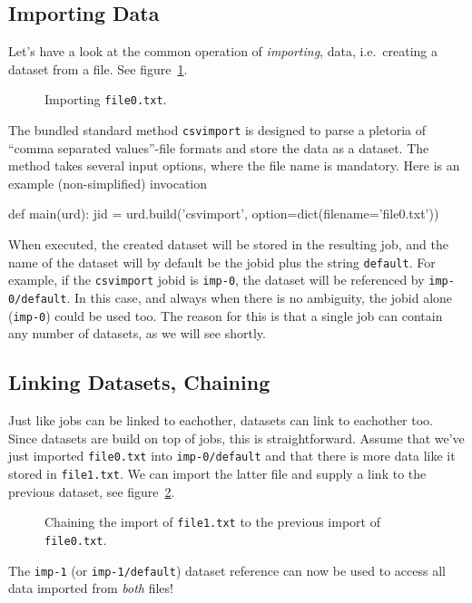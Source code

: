 \subsection{Importing Data}

Let's have a look at the common operation of \textsl{importing},
data, i.e.\ creating a dataset from a file.  See
figure~\ref{fig:dataset_csvimport}.

\begin{figure}[h!]
  \begin{center}
    
    \caption{Importing \texttt{file0.txt}.}
    \label{fig:dataset_csvimport}
  \end{center}
\end{figure}

\noindent The bundled standard method \texttt{csvimport} is designed
to parse a pletoria of ``comma separated values''-file formats and
store the data as a dataset.  The method takes several input options,
where the file name is mandatory.  Here is an example (non-simplified)
invocation
\begin{python}
def main(urd):
    jid = urd.build('csvimport', option=dict(filename='file0.txt'))  
\end{python}
When executed, the created dataset
will be stored in the resulting job, and the name of the dataset will
by default be the jobid plus the string \texttt{default}.  For
example, if the \texttt{csvimport} jobid is \texttt{imp-0}, the
dataset will be referenced by \texttt{imp-0/default}.  In this case,
and always when there is no ambiguity, the jobid alone
(\texttt{imp-0}) could be used too.  The reason for this is that a
single job can contain any number of datasets, as we will see shortly.



\subsection{Linking Datasets, Chaining}

Just like jobs can be linked to eachother, datasets can link to
eachother too.  Since datasets are build on top of jobs, this is
straightforward.  Assume that we've just imported \texttt{file0.txt}
into \texttt{imp-0/default} and that there is more data like it stored
in \texttt{file1.txt}.  We can import the latter file and supply a
link to the previous dataset, see
figure~\ref{fig:dataset_csvimport_chain}.
\begin{figure}[h!]
  \begin{center}
    
    \caption{Chaining the import of \texttt{file1.txt} to the previous
      import of \texttt{file0.txt}.}
    \label{fig:dataset_csvimport_chain}
  \end{center}
\end{figure}
The \texttt{imp-1} (or \texttt{imp-1/default}) dataset reference can
now be used to access all data imported from \textsl{both} files!

